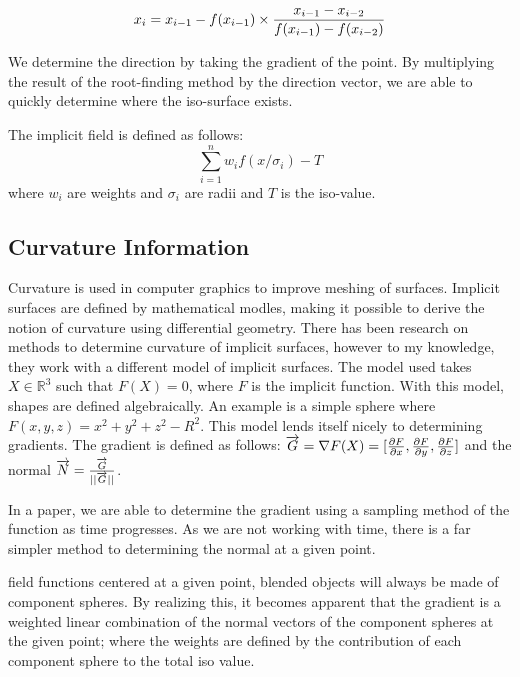 \documentclass[conference]{acmsiggraph}
\begin{document}
$$x_i = x_{i-1} - f(x_{i-1}) \times {{x_{i-1} - x_{i-2}}\over{f(x_{i-1}) -
f(x_{i-2})}}$$

We determine the direction by taking the gradient of the point. By multiplying
the result of the root-finding method by the direction vector, we are able to
quickly determine where the iso-surface exists.

The implicit field is defined as follows:
$$\sum\limits_{i=1}^n w_i f(x / \sigma_i ) - T$$
where $w_i$ are weights and $\sigma_i$ are radii and $T$ is the iso-value.


\subsection{Curvature Information}
Curvature is used in computer graphics to improve meshing of surfaces. Implicit
surfaces are defined by mathematical modles, making it possible to derive the
notion of curvature using differential geometry. There has been research on
methods to determine curvature\cite{DeAraujo2004} of implicit surfaces, however
to my knowledge, they work with a different model of implicit surfaces. The
model used takes $X \in \mathbb{R}^3$ such that $F(X) = 0$, where $F$ is the
implicit function. With this model, shapes are defined algebraically. An
example is a simple sphere where $F(x, y, z) = x^2 + y ^ 2 + z ^2 - R^2$. This
model lends itself nicely to determining gradients. The gradient is defined as
follows: $\overrightarrow{G} = \nabla F(X) = [{\partial F\over\partial x},
{\partial F \over \partial y}, {\partial F \over \partial z}]$ and the normal
$\overrightarrow{N} = {\overrightarrow{G} \over ||\overrightarrow{G}||}$.



In a paper\cite{Stam2011}, we are able to determine the gradient using a
sampling method of the function as time progresses. As we are not working with time, there is a far simpler
method to determining the normal at a given point. 







field functions centered at a given point, blended objects will always be made
of component spheres. By realizing this, it becomes apparent that the gradient
is a weighted linear combination of the normal vectors of the component spheres
at the given point; where the weights are defined by the contribution of each
component sphere to the total iso value.
\end{document}
